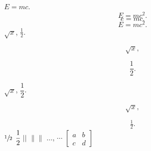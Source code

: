 \documentclass{article}
\begin{document}
    $E = mc$.
    \begin{equation}
        E = mc^2.
    \end{equation}
    \[e = mc.\]
    \begin{equation}
        E = mc^2.
    \end{equation}
    $\sqrt{x}$, $\frac{1}{2}$.


    \[ \sqrt{x}, \]

    \[ \frac{1}{2}. \]

    $\sqrt{x}$, $\dfrac{1}{2}$.


    \[ \sqrt{x}, \]

    \[ \tfrac{1}{2}. \]
    $\sfrac{1}{2}$
    $\cfrac{1}{2}$
    $\lvert\rvert$
    $\lVert\rVert$
    $\dots$, $\cdots$
    $[\begin{smallmatrix}
        a&b \\ c&d
    \end{smallmatrix}]$
\end{document}

